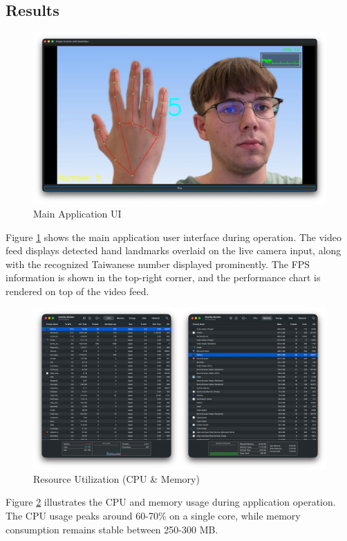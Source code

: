\documentclass{article}
\begin{document}
\subsection{Results}

\begin{figure}[H]
	\centering
	\includegraphics[width=12cm]{ui.png}
	\caption{Main Application UI}
	\label{fig:main_ui}
\end{figure}

Figure \ref{fig:main_ui} shows the main application user interface during operation. The video feed displays detected hand landmarks overlaid on the live camera input, along with the recognized Taiwanese number displayed prominently. The FPS information is shown in the top-right corner, and the performance chart is rendered on top of the video feed.

\begin{figure}[H]
	\centering
	\includegraphics[width=12cm]{resource_utilization.png}
	\caption{Resource Utilization (CPU \& Memory)}
	\label{fig:resource_utilization}
\end{figure}

Figure \ref{fig:resource_utilization} illustrates the CPU and memory usage during application operation. The CPU usage peaks around 60-70\% on a single core, while memory consumption remains stable between 250-300 MB.
\end{document}
